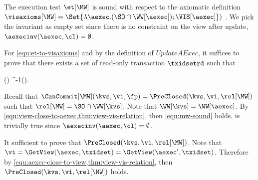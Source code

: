 The execution test \(\et[\MW]\) is sound with respect to the axiomatic definition 
\(\visaxioms[\MW] = \Set{\lambda \aexec. ( \SO \cap \WW[\aexec] ) ; \VIS[\aexec] })\) \cite{repldatatypes}.
We pick the invariant as empty set since there is no constraint on the view after update,
\( \aexecinv(\aexec, \cl) = \emptyset \).

For \cref{equ:et-to-visaxioms} and by the definition of \( UpdateAExec \), 
it suffices to prove that there exists a set of read-only transaction \( \txidsetrd \)
such that
\begin{Formulae}
\begin{Formula}
    (\txidset \cup \txidsetrd ) \subseteq \rel[\MW]^{-1}(\txidset \cup \txidsetrd).
    \label{equ:mw-sound}
\end{Formula}
\end{Formulae}
Recall that \(\CanCommit[\MW](\kvs,\vi,\fp) = \PreClosed(\kvs,\vi,\rel[\MW]) \)
such that \( \rel[\MW] = \SO \cap \WW[\kvs] \).
Note that \( \WW[\kvs] = \WW[\aexec]\).
By \cref{equ:view-close-to-aexec,thm:view-vis-relation}, then \cref{equ:mw-sound} holds.
 is trivially true since \(\aexecinv(\aexec, \cl) = \emptyset \).

\COMPLETELET{\MW}
It sufficient to prove that \( \PreClosed(\kvs,\vi,\rel[\MW]) \).
Note that \( \vi = \GetView(\aexec,\txidset) = \GetView(\aexec',\txidset) \).
Therefore by \cref{equ:aexec-close-to-view,thm:view-vis-relation},
then \( \PreClosed(\kvs,\vi,\rel[\MW]) \)  holds.
